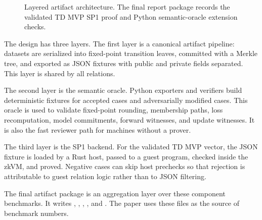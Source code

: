\begin{figure}[!t]
\centering
{}
\caption{Layered artifact architecture. The final report package records the
validated TD MVP SP1 proof and Python semantic-oracle extension checks.}
\label{fig:system-architecture}
\end{figure}

The design has three layers. The first layer is a canonical artifact pipeline:
datasets are serialized into fixed-point transition leaves, committed with a
Merkle tree, and exported as JSON fixtures with public and private fields
separated. This layer is shared by all relations.

The second layer is the semantic oracle. Python exporters and verifiers build
deterministic fixtures for accepted cases and adversarially modified cases.
This oracle is used to validate fixed-point rounding, membership paths, loss
recomputation, model commitments, forward witnesses, and update witnesses. It is
also the fast reviewer path for machines without a prover.

The third layer is the SP1 backend. For the validated TD MVP vector, the JSON
fixture is loaded by a Rust host, passed to a guest program, checked inside the
zkVM, and proved. Negative cases can skip host prechecks so that rejection is
attributable to guest relation logic rather than to JSON filtering.

The final artifact package is an aggregation layer over these component
benchmarks. It writes
,
, , , and
. The paper uses these files as the source of benchmark
numbers.
